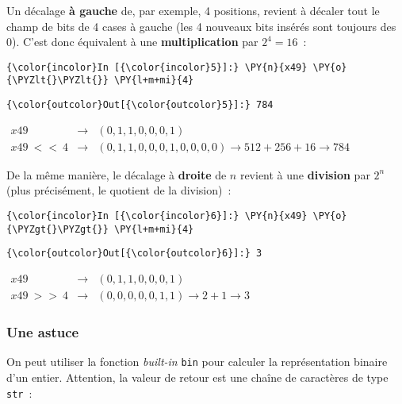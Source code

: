    Un décalage \textbf{à gauche} de, par exemple, 4 positions, revient à
décaler tout le champ de bits de 4 cases à gauche (les 4 nouveaux bits
insérés sont toujours des 0). C'est donc équivalent à une
\textbf{multiplication} par \(2^4 = 16\)~:

    \begin{Verbatim}[commandchars=\\\{\}]
{\color{incolor}In [{\color{incolor}5}]:} \PY{n}{x49} \PY{o}{\PYZlt{}\PYZlt{}} \PY{l+m+mi}{4}
\end{Verbatim}


\begin{Verbatim}[commandchars=\\\{\}]
{\color{outcolor}Out[{\color{outcolor}5}]:} 784
\end{Verbatim}
            
    \(\begin{array}{rcl} x49 & \rightarrow & (0,1,1,0,0,0,1) \\ x49\ <<\ 4 & \rightarrow & (0,1,1,0,0,0,1,0,0,0,0) \rightarrow 512 + 256 + 16 \rightarrow 784 \end{array}\)

    De la même manière, le décalage à \textbf{droite} de \(n\) revient à une
\textbf{division} par \(2^n\) (plus précisément, le quotient de la
division)~:

    \begin{Verbatim}[commandchars=\\\{\}]
{\color{incolor}In [{\color{incolor}6}]:} \PY{n}{x49} \PY{o}{\PYZgt{}\PYZgt{}} \PY{l+m+mi}{4}
\end{Verbatim}


\begin{Verbatim}[commandchars=\\\{\}]
{\color{outcolor}Out[{\color{outcolor}6}]:} 3
\end{Verbatim}
            
    \(\begin{array}{rcl} x49 & \rightarrow & (0,1,1,0,0,0,1) \\ x49\ >>\ 4 & \rightarrow & (0,0,0,0,0,1,1) \rightarrow 2 + 1 \rightarrow 3 \end{array}\)

    \hypertarget{une-astuce}{%
\subsubsection{Une astuce}\label{une-astuce}}

    On peut utiliser la fonction \emph{built-in} \texttt{bin} pour calculer
la représentation binaire d'un entier. Attention, la valeur de retour
est une chaîne de caractères de type \texttt{str}~:

